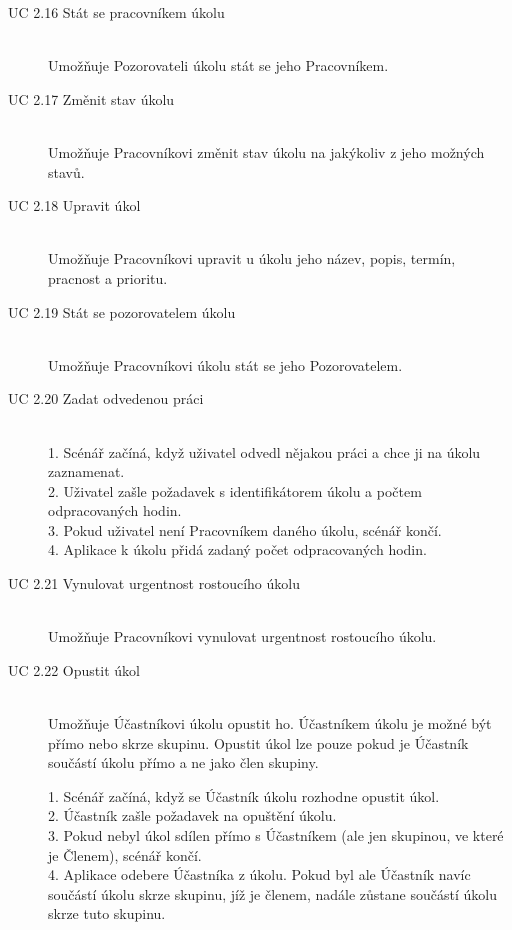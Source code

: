 \documentclass[thesis=B,czech]{FITthesis}[2012/06/26]
\begin{document}
\begin{description}
				
				\item[UC 2.16 Stát se pracovníkem úkolu] \hfill \\
					Umožňuje Pozorovateli úkolu stát se jeho Pracovníkem.				
								
				\item[UC 2.17 Změnit stav úkolu] \hfill \\
					Umožňuje Pracovníkovi změnit stav úkolu na jakýkoliv z jeho možných stavů.
				
				\item[UC 2.18 Upravit úkol] \hfill \\
					Umožňuje Pracovníkovi upravit u úkolu jeho název, popis, termín, pracnost a prioritu.
				
				\item[UC 2.19 Stát se pozorovatelem úkolu] \hfill \\
					Umožňuje Pracovníkovi úkolu stát se jeho Pozorovatelem.
					
				\item[UC 2.20 Zadat odvedenou práci] \hfill \\
					1. Scénář začíná, když uživatel odvedl nějakou práci a chce ji na úkolu zaznamenat. \\
					2. Uživatel zašle požadavek s identifikátorem úkolu a počtem odpracovaných hodin. \\
					3. Pokud uživatel není Pracovníkem daného úkolu, scénář končí. \\
					4. Aplikace k úkolu přidá zadaný počet odpracovaných hodin. \\
					
				\item[UC 2.21 Vynulovat urgentnost rostoucího úkolu] \hfill \\
					Umožňuje Pracovníkovi vynulovat urgentnost rostoucího úkolu.
					
				\item[UC 2.22 Opustit úkol] \hfill \\
					Umožňuje Účastníkovi úkolu opustit ho. Účastníkem úkolu je možné být přímo nebo skrze skupinu. Opustit úkol lze pouze pokud je Účastník součástí úkolu přímo a ne jako člen skupiny.
				
					1. Scénář začíná, když se Účastník úkolu rozhodne opustit úkol. \\
					2. Účastník zašle požadavek na opuštění úkolu. \\
					3. Pokud nebyl úkol sdílen přímo s Účastníkem (ale jen skupinou, ve které je Členem), scénář končí. \\
					4. Aplikace odebere Účastníka z úkolu. Pokud byl ale Účastník navíc součástí úkolu skrze skupinu, jíž je členem, nadále zůstane součástí úkolu skrze tuto skupinu.
			\end{description}
			
\end{document}
